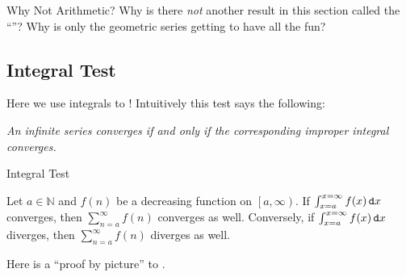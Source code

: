 \begin{exercise}{Why Not Arithmetic? \Coffeecup \Coffeecup \Coffeecup}
Why is there \emph{not} another result in this section called the ``''?  Why is only the geometric series getting to have all the fun?
\end{exercise}

\subsection{Integral Test}\label{IntTest}

Here we use integrals to !  Intuitively this test says the following:

\begin{center}
\emph{An infinite series converges if and only if the corresponding improper integral converges.} 
\end{center}

\begin{theorem}{Integral Test}

Let $a\in \mathbb{N}$ and $f(n)$ be a decreasing function on $\left[ a,\infty\right)$.  If $\int_{x=a}^{x=\infty} f(x) \mathop{}\!\mathtt{d} x$ converges, then $\sum_{n=a}^\infty f(n)$ converges as well.  Conversely, if $\int_{x=a}^{x=\infty} f(x) \mathop{}\!\mathtt{d} x$ diverges, then $\sum_{n=a}^\infty f(n)$ diverges as well.  

\end{theorem}

Here is a ``proof by picture'' to .

